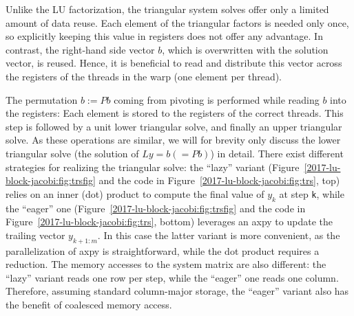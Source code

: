 Unlike the LU factorization,
the triangular system solves offer only a limited amount of data reuse.
Each element of the triangular factors is needed only once,
so explicitly keeping this value in registers does not offer any advantage.
In contrast, the right-hand side vector $b$, which is overwritten with the solution 
vector, is reused.
Hence, it is beneficial to read and distribute this vector across the registers
of the threads in the warp (one element per thread).

The permutation $b := Pb$ coming from pivoting
is performed while reading $b$ into the registers:
Each element is stored to the registers of the correct threads.
This step is followed by a unit lower triangular solve, and finally an upper triangular solve.
As these operations are similar, we will for brevity only discuss 
the lower triangular solve (the solution of $Ly = b (= Pb)$) in detail.
There exist different strategies for realizing the triangular solve:
the ``lazy'' variant (Figure~\ref{2017-lu-block-jacobi:fig:trsfig} and the code in Figure~\ref{2017-lu-block-jacobi:fig:trs}, top) relies on an inner ({\sc dot}) product
to compute the final value of $y_k$ at step \texttt{k},
while the ``eager'' one (Figure~\ref{2017-lu-block-jacobi:fig:trsfig} and the code in Figure~\ref{2017-lu-block-jacobi:fig:trs}, bottom) leverages an {\sc axpy}
to update the trailing vector $y_{k+1:m}$.
In this case the latter variant is more convenient,
as the parallelization of {\sc axpy} is straightforward,
while the {\sc dot} product requires a reduction.
The memory accesses to the system matrix are also different:
the ``lazy'' variant reads one row per step,
while the ``eager'' one reads one column.
Therefore, assuming standard column-major storage,
the ``eager'' variant also has the benefit of coalesced memory access.

